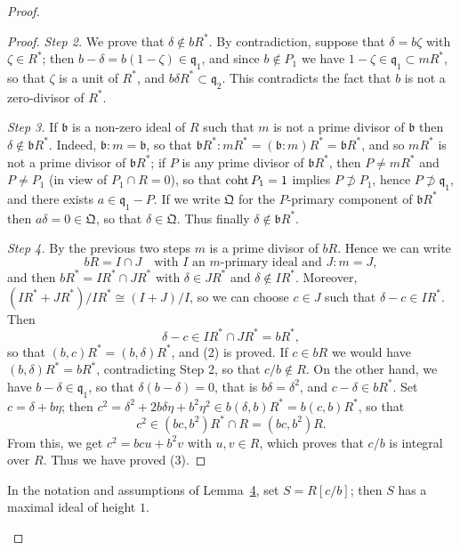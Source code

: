 \begin{proof}
\begin{proof}
\textit{Step 2.} We prove that $\delta \notin bR^*$. By contradiction, suppose that
$\delta = b\zeta$ with $\zeta \in R^*$; then $b - \delta = b(1 - \zeta) \in \mathfrak{q}_1$, and since
$b \notin P_1$ we have $1 - \zeta \in \mathfrak{q}_1 \subset mR^*$, so that $\zeta$ is a unit of $R^*$, and
$b\delta R^* \subset \mathfrak{q}_2$. This contradicts the fact that $b$ is not a zero-divisor of
$R^*$.

\textit{Step 3.} If $\mathfrak{b}$ is a non-zero ideal of $R$ such that $m$ is not a prime divisor of
$\mathfrak{b}$ then $\delta \notin \mathfrak{b}R^*$. Indeed, $\mathfrak{b} : m = \mathfrak{b}$, so that
$\mathfrak{b}R^* : mR^* = (\mathfrak{b} : m)R^* = \mathfrak{b}R^*$, and so $mR^*$ is not a prime divisor of
$\mathfrak{b}R^*$; if $P$ is any prime divisor of $\mathfrak{b}R^*$, then $P \ne mR^*$ and
$P \ne P_1$ (in view of $P_1 \cap R = 0$), so that $\operatorname{coht} P_1 = 1$ implies $P \not\supset P_1$,
hence $P \not\supset \mathfrak{q}_1$, and there exists $a \in \mathfrak{q}_1 - P$. If we write $\mathfrak{Q}$ for the
$P$-primary component of $\mathfrak{b}R^*$ then $a\delta = 0 \in \mathfrak{Q}$, so that
$\delta \in \mathfrak{Q}$. Thus finally $\delta \notin \mathfrak{b}R^*$.

\textit{Step 4.} By the previous two steps $m$ is a prime divisor of $bR$. Hence we can
write
\[
  bR = I \cap J \quad \text{with } I \text{ an } m\text{-primary ideal and } J : m = J,
\]
and then $bR^* = IR^* \cap JR^*$ with $\delta \in JR^*$ and $\delta \notin IR^*$. Moreover,
$(IR^* + JR^*)/IR^* \cong (I + J)/I$, so we can choose $c \in J$ such that
$\delta - c \in IR^*$. Then
\[
  \delta - c \in IR^* \cap JR^* = bR^*,
\]
so that $(b, c)R^* = (b, \delta)R^*$, and (2) is proved. If $c \in bR$ we would have
$(b, \delta)R^* = bR^*$, contradicting Step 2, so that $c/b \notin R$. On the other hand, we
have $b - \delta \in \mathfrak{q}_1$, so that $\delta(b - \delta) = 0$, that is $b\delta = \delta^2$, and
$c - \delta \in bR^*$. Set $c = \delta + b\eta$; then
$c^2 = \delta^2 + 2b\delta\eta + b^2\eta^2 \in b(\delta, b)R^* = b(c, b)R^*$, so that
\[
  c^2 \in (bc, b^2)R^* \cap R = (bc, b^2)R.
\]
From this, we get $c^2 = bcu + b^2v$ with $u, v \in R$, which proves that $c/b$ is integral
over $R$. Thus we have proved (3).
\end{proof}

\begin{lemma}\label{lem:31.5}
In the notation and assumptions of Lemma~\hyperref[lem:31.4]{4}, set $S = R[c/b]$; then $S$ has a
maximal ideal of height $1$.
\end{lemma}


\end{proof}
